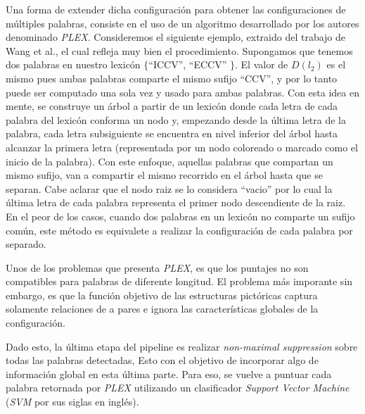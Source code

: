 	Una forma de extender dicha configuración para obtener las configuraciones de múltiples palabras, consiste en el uso de un algoritmo desarrollado por los autores denominado \textit{PLEX}. Consideremos el siguiente ejemplo, extraido del trabajo de Wang et al., el cual refleja muy bien el procedimiento. Supongamos que tenemos dos palabras en nuestro lexicón $\{$``ICCV'', ``ECCV'' $\}$. El valor de $D(l_2)$ es el mismo pues ambas palabras comparte el mismo sufijo ``CCV'', y por lo tanto puede ser computado una sola vez y usado para ambas palabras. Con esta idea en mente, se construye un árbol a partir de un lexicón donde cada letra de cada palabra del lexicón conforma un nodo y, empezando desde la última letra de la palabra, cada letra subsiguiente se encuentra en nivel inferior del árbol hasta alcanzar la primera letra (representada por un nodo coloreado o marcado como el inicio de la palabra). Con este enfoque, aquellas palabras que compartan un mismo sufijo, van a compartir el mismo recorrido en el árbol hasta que se separan. Cabe aclarar que el nodo raiz se lo considera ``vacio'' por lo cual la última letra de cada palabra representa el primer nodo descendiente de la raiz. En el peor de los casos, cuando dos palabras en un lexicón no comparte un sufijo común, este método es equivalete a realizar la configuración de cada palabra por separado.
	
	Unos de los problemas que presenta \textit{PLEX}, es que los puntajes no son compatibles para palabras de diferente longitud. El problema más imporante sin embargo, es que la función objetivo de las estructuras pictóricas captura solamente relaciones de a pares e ignora las características globales de la configuración.
	
	Dado esto, la última etapa del pipeline es realizar \textit{non-maximal suppression} sobre todas las palabras detectadas, Esto con el objetivo de incorporar algo de información global en esta última parte. Para eso, se vuelve a puntuar cada palabra retornada por \textit{PLEX} utilizando un clasificador \textit{Support Vector Machine} (\textit{SVM} por sus siglas en inglés).
	